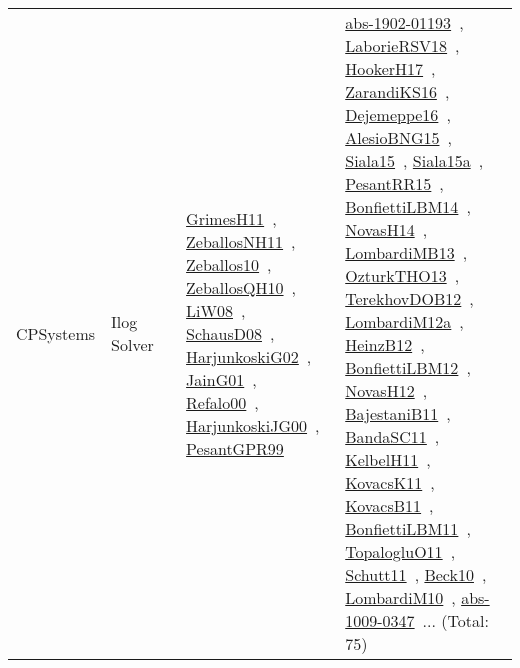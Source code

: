 {\begin{longtable}{lp{3cm}>{\raggedright\arraybackslash}p{6cm}>{\raggedright\arraybackslash}p{6cm}>{\raggedright\arraybackslash}p{8cm}}
CPSystems & Ilog Solver &  & \href{../works/GrimesH11.pdf}{GrimesH11}~\cite{GrimesH11}, \href{../works/ZeballosNH11.pdf}{ZeballosNH11}~\cite{ZeballosNH11}, \href{../works/Zeballos10.pdf}{Zeballos10}~\cite{Zeballos10}, \href{../works/ZeballosQH10.pdf}{ZeballosQH10}~\cite{ZeballosQH10}, \href{../works/LiW08.pdf}{LiW08}~\cite{LiW08}, \href{../works/SchausD08.pdf}{SchausD08}~\cite{SchausD08}, \href{../works/HarjunkoskiG02.pdf}{HarjunkoskiG02}~\cite{HarjunkoskiG02}, \href{../works/JainG01.pdf}{JainG01}~\cite{JainG01}, \href{../works/Refalo00.pdf}{Refalo00}~\cite{Refalo00}, \href{../works/HarjunkoskiJG00.pdf}{HarjunkoskiJG00}~\cite{HarjunkoskiJG00}, \href{../works/PesantGPR99.pdf}{PesantGPR99}~\cite{PesantGPR99} & \href{../works/abs-1902-01193.pdf}{abs-1902-01193}~\cite{abs-1902-01193}, \href{../works/LaborieRSV18.pdf}{LaborieRSV18}~\cite{LaborieRSV18}, \href{../works/HookerH17.pdf}{HookerH17}~\cite{HookerH17}, \href{../works/ZarandiKS16.pdf}{ZarandiKS16}~\cite{ZarandiKS16}, \href{../works/Dejemeppe16.pdf}{Dejemeppe16}~\cite{Dejemeppe16}, \href{../works/AlesioBNG15.pdf}{AlesioBNG15}~\cite{AlesioBNG15}, \href{../works/Siala15.pdf}{Siala15}~\cite{Siala15}, \href{../works/Siala15a.pdf}{Siala15a}~\cite{Siala15a}, \href{../works/PesantRR15.pdf}{PesantRR15}~\cite{PesantRR15}, \href{../works/BonfiettiLBM14.pdf}{BonfiettiLBM14}~\cite{BonfiettiLBM14}, \href{../works/NovasH14.pdf}{NovasH14}~\cite{NovasH14}, \href{../works/LombardiMB13.pdf}{LombardiMB13}~\cite{LombardiMB13}, \href{../works/OzturkTHO13.pdf}{OzturkTHO13}~\cite{OzturkTHO13}, \href{../works/TerekhovDOB12.pdf}{TerekhovDOB12}~\cite{TerekhovDOB12}, \href{../works/LombardiM12a.pdf}{LombardiM12a}~\cite{LombardiM12a}, \href{../works/HeinzB12.pdf}{HeinzB12}~\cite{HeinzB12}, \href{../works/BonfiettiLBM12.pdf}{BonfiettiLBM12}~\cite{BonfiettiLBM12}, \href{../works/NovasH12.pdf}{NovasH12}~\cite{NovasH12}, \href{../works/BajestaniB11.pdf}{BajestaniB11}~\cite{BajestaniB11}, \href{../works/BandaSC11.pdf}{BandaSC11}~\cite{BandaSC11}, \href{../works/KelbelH11.pdf}{KelbelH11}~\cite{KelbelH11}, \href{../works/KovacsK11.pdf}{KovacsK11}~\cite{KovacsK11}, \href{../works/KovacsB11.pdf}{KovacsB11}~\cite{KovacsB11}, \href{../works/BonfiettiLBM11.pdf}{BonfiettiLBM11}~\cite{BonfiettiLBM11}, \href{../works/TopalogluO11.pdf}{TopalogluO11}~\cite{TopalogluO11}, \href{../works/Schutt11.pdf}{Schutt11}~\cite{Schutt11}, \href{../works/Beck10.pdf}{Beck10}~\cite{Beck10}, \href{../works/LombardiM10.pdf}{LombardiM10}~\cite{LombardiM10}, \href{../works/abs-1009-0347.pdf}{abs-1009-0347}~\cite{abs-1009-0347}... (Total: 75)\\

\end{longtable}}
